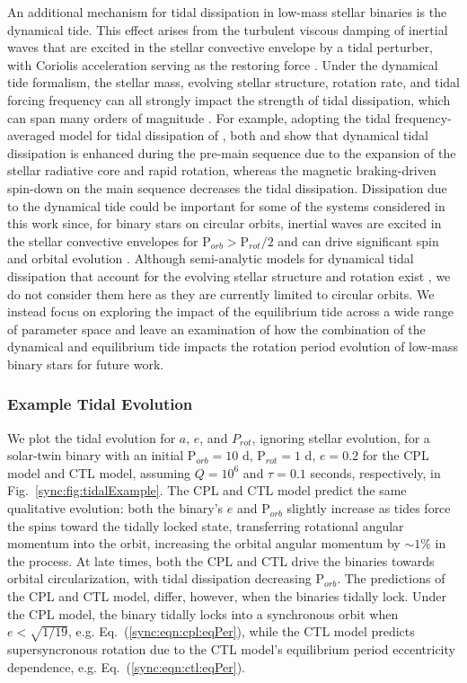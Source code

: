 An additional mechanism for tidal dissipation in low-mass stellar binaries is the dynamical tide. This effect arises from the turbulent viscous damping of inertial waves that are excited in the stellar convective envelope by a tidal perturber, with Coriolis acceleration serving as the restoring force \citep{Zahn1975,Ogilvie2007}. Under the dynamical tide formalism, the stellar mass, evolving stellar structure, rotation rate, and tidal forcing frequency can all strongly impact the strength of tidal dissipation, which can span many orders of magnitude \citep{Ogilvie2007,Ogilvie2013,Mathis2015,Gallet2017}. For example, adopting the tidal frequency-averaged model for tidal dissipation of \citet{Ogilvie2013}, both \citet{Mathis2015} and \citet{Gallet2017} show that dynamical tidal dissipation is enhanced during the pre-main sequence due to the expansion of the stellar radiative core and rapid rotation, whereas the magnetic braking-driven spin-down on the main sequence decreases the tidal dissipation. Dissipation due to the dynamical tide could be important for some of the systems considered in this work since, for binary stars on circular orbits, inertial waves are excited in the stellar convective envelopes for P$_{orb} > $P$_{rot}/2$ and can drive significant spin and orbital evolution \citep[e.g.][]{Witte2002,Ogilvie2007,Bolmont2016}. Although semi-analytic models for dynamical tidal dissipation that account for the evolving stellar structure and rotation exist \citep[e.g.][]{Mathis2015,Bolmont2016,Gallet2017}, we do not consider them here as they are currently limited to circular orbits. We instead focus on exploring the impact of the equilibrium tide across a wide range of parameter space and leave an examination of how the combination of the dynamical and equilibrium tide impacts the rotation period evolution of low-mass binary stars for future work.

\subsubsection{Example Tidal Evolution} \label{sync:sec:methods:eqtideExample}

We plot the tidal evolution for $a$, $e$, and $P_{rot}$, ignoring stellar evolution, for a solar-twin binary with an initial P$_{orb} = 10$ d, P$_{rot} = 1$ d, $e = 0.2$ for the CPL model and CTL model, assuming $Q=10^6$ and $\tau = 0.1$ seconds, respectively, in Fig.~\ref{sync:fig:tidalExample}. The CPL and CTL model predict the same qualitative evolution: both the binary's $e$ and P$_{orb}$ slightly increase as tides force the spins toward the tidally locked state, transferring rotational angular momentum into the orbit, increasing the orbital angular momentum by ${\sim}1\%$ in the process.  At late times, both the CPL and CTL drive the binaries towards orbital circularization, with tidal dissipation decreasing P$_{orb}$. The predictions of the CPL and CTL model, differ, however, when the binaries tidally lock.  Under the CPL model, the binary tidally locks into a synchronous orbit when $e < \sqrt{1/19}$, e.g. Eq.~(\ref{sync:eqn:cpl:eqPer}), while the CTL model predicts supersyncronous rotation due to the CTL model's equilibrium period eccentricity dependence, e.g. Eq.~(\ref{sync:eqn:ctl:eqPer}).

